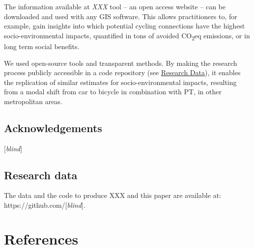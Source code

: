 \documentclass[review, doubleblind, 3p,
authoryear]{elsarticle} %
\begin{document}
The information available at \emph{XXX} tool -- an open access website
-- can be downloaded and used with any GIS software. This allows
practitioners to, for example, gain insights into which potential
cycling connections have the highest socio-environmental impacts,
quantified in tons of avoided CO\textsubscript{2}eq emissions, or in
long term social benefits.

We used open-source tools and transparent methods. By making the
research process publicly accessible in a code repository (see
\protect\hyperlink{research-data}{Research Data}), it enables the
replication of similar estimates for socio-environmental impacts,
resulting from a modal shift from car to bicycle in combination with PT,
in other metropolitan areas.

\hypertarget{acknowledgements}{%
\subsection*{Acknowledgements}\label{acknowledgements}}

{[}\emph{blind}{]}

\hypertarget{research-data}{%
\subsection*{Research data}\label{research-data}}

The data and the code to produce XXX and this paper are available at:
https://github.com/{[}\emph{blind}{]}.

\hypertarget{references}{%
\section*{References}\label{references}}
\end{document}
